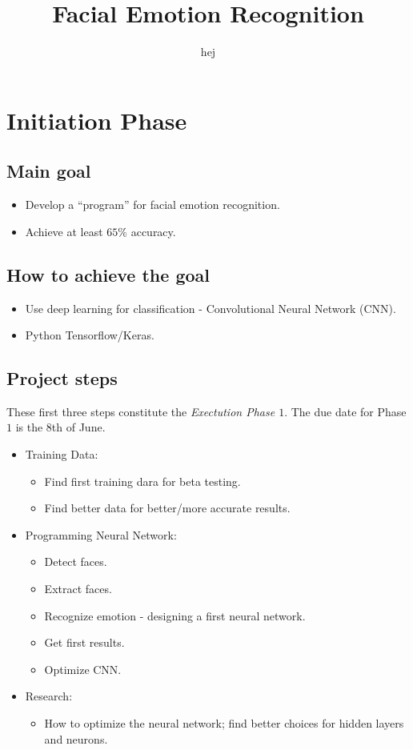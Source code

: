 \documentclass[]{article}
\begin{document}
\author{hej}
\title{Facial Emotion Recognition}
\maketitle{}

\section{Initiation Phase}
\subsection{Main goal}
\begin{itemize}
\item Develop a ``program'' for facial emotion recognition.
\item Achieve at least $65$\% accuracy.
\end{itemize}

\subsection{How to achieve the goal}
\begin{itemize}
\item Use deep learning for classification - Convolutional Neural Network (CNN).
\item Python Tensorflow/Keras.
\end{itemize}

\subsection{Project steps}

These first three steps constitute the \textit{Exectution Phase $1$}. The due date for Phase $1$ is the 8th of June.

\begin{itemize}
\item Training Data:
	\begin{itemize}
	\item Find first training dara for beta testing.
	\item Find better data for better/more accurate results.
	\end{itemize}

\item Programming Neural Network:
	\begin{itemize}
	\item Detect faces.
	\item Extract faces.
	\item Recognize emotion - designing a first neural network.
	\item Get first results.
	\item Optimize CNN.
	\end{itemize}
	
\item Research:
	\begin{itemize}
	\item How to optimize the neural network; find better choices for hidden layers and neurons. 
	\end{itemize}
\end{itemize}
\end{document}
